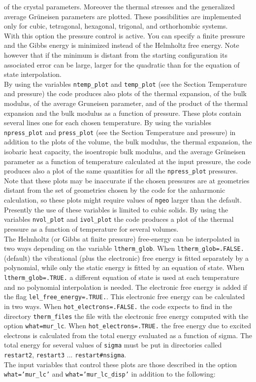 \documentclass[12pt,a4paper,twoside]{report}
\begin{document}
of the crystal parameters.
Moreover the thermal stresses and the generalized average Gr\"uneisen
parameters are plotted.
These possibilities are implemented only for cubic, tetragonal, 
hexagonal, trigonal, and orthorhombic systems. \\
With this option the pressure control is active. You can specify a
finite pressure and the Gibbs energy is minimized instead of the
Helmholtz free energy. Note however that if the minimum is distant from 
the starting configuration its associated error can be large, larger for the
quadratic than for the equation of state interpolation. \\
By using the variables \texttt{ntemp\_plot} and \texttt{temp\_plot} (see
the Section Temperature and pressure) the code produces also plots
of the thermal expansion, of the bulk modulus, of the average 
Gruneisen parameter, and of the product of the thermal expansion
and the bulk modulus as a function of pressure. These plots contain
several lines one for each chosen temperature.
By using the variables \texttt{npress\_plot} and \texttt{press\_plot} (see
the Section Temperature and pressure) in addition to the plots of
the volume, the bulk modulus, the thermal expansion, the 
isobaric heat capacity, 
the isoentropic bulk modulus, and the average Gr\"uneisen parameter 
as a function of temperature calculated at the input pressure, the code
produces also a plot of the same quantities for all the \texttt{npress\_plot}
pressures. Note that these plots may be inaccurate if the chosen
pressures are at geometries distant from the set of geometries chosen
by the code for the anharmonic calculation, so these plots might
require values of \texttt{ngeo} larger than the default. Presently the
use of these variables is limited to cubic solids.
By using the variables \texttt{nvol\_plot} and \texttt{ivol\_plot} the
code produces a plot of the thermal pressure as a function of temperature
for several volumes. \\
The Helmholtz (or Gibbs at finite pressure) free-energy can be interpolated
in two ways depending on the variable \texttt{ltherm\_glob}. 
When \texttt{ltherm\_glob=.FALSE.} (default) the vibrational (plus 
the electronic) free energy is fitted separately by a polynomial, while
only the static energy is fitted by an equation of state. When
 \texttt{ltherm\_glob=.TRUE.} a different equation of state is used 
at each temperature and no polynomial interpolation is needed.
The electronic free energy is added if the flag 
\texttt{lel\_free\_energy=.TRUE.}. This electronic free energy can be 
calculated in two ways. When \texttt{hot\_electrons=.FALSE.} the code 
expects to find in the directory \texttt{therm\_files} the file with 
the electronic free energy computed with the option \texttt{what=mur\_lc}.
When \texttt{hot\_electrons=.TRUE.} the free energy due to excited
electrons is calculated from the total energy evaluated as a function
of sigma. The total energy for several values of \texttt{sigma} must
be put in directories called \texttt{restart2}, \texttt{restart3} ...
\texttt{restart\#nsigma}. \\
The input variables that control these plots are those described in the option
\texttt{what='mur\_lc'} and \texttt{what='mur\_lc\_disp'} in addition to the 
following:
\end{document}
